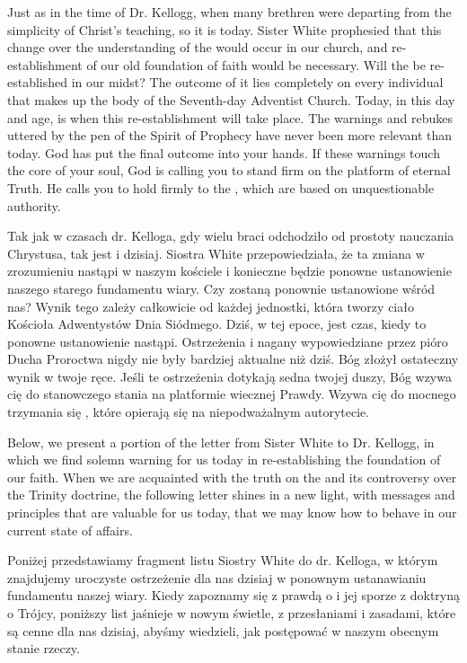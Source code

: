 Just as in the time of Dr. Kellogg, when many brethren were departing from the simplicity of Christ’s teaching, so it is today. Sister White prophesied that this change over the understanding of the  would occur in our church, and re-establishment of our old foundation of faith would be necessary. Will the  be re-established in our midst? The outcome of it lies completely on every individual that makes up the body of the Seventh-day Adventist Church. Today, in this day and age, is when this re-establishment will take place. The warnings and rebukes uttered by the pen of the Spirit of Prophecy have never been more relevant than today. God has put the final outcome into your hands. If these warnings touch the core of your soul, God is calling you to stand firm on the platform of eternal Truth. He calls you to hold firmly to the , which are based on unquestionable authority.


Tak jak w czasach dr. Kelloga, gdy wielu braci odchodziło od prostoty nauczania Chrystusa, tak jest i dzisiaj. Siostra White przepowiedziała, że ta zmiana w zrozumieniu  nastąpi w naszym kościele i konieczne będzie ponowne ustanowienie naszego starego fundamentu wiary. Czy  zostaną ponownie ustanowione wśród nas? Wynik tego zależy całkowicie od każdej jednostki, która tworzy ciało Kościoła Adwentystów Dnia Siódmego. Dziś, w tej epoce, jest czas, kiedy to ponowne ustanowienie nastąpi. Ostrzeżenia i nagany wypowiedziane przez pióro Ducha Proroctwa nigdy nie były bardziej aktualne niż dziś. Bóg złożył ostateczny wynik w twoje ręce. Jeśli te ostrzeżenia dotykają sedna twojej duszy, Bóg wzywa cię do stanowczego stania na platformie wiecznej Prawdy. Wzywa cię do mocnego trzymania się , które opierają się na niepodważalnym autorytecie.


Below, we present a portion of the letter from Sister White to Dr. Kellogg, in which we find solemn warning for us today in re-establishing the foundation of our faith. When we are acquainted with the truth on the  and its controversy over the Trinity doctrine, the following letter shines in a new light, with messages and principles that are valuable for us today, that we may know how to behave in our current state of affairs.


Poniżej przedstawiamy fragment listu Siostry White do dr. Kelloga, w którym znajdujemy uroczyste ostrzeżenie dla nas dzisiaj w ponownym ustanawianiu fundamentu naszej wiary. Kiedy zapoznamy się z prawdą o  i jej sporze z doktryną o Trójcy, poniższy list jaśnieje w nowym świetle, z przesłaniami i zasadami, które są cenne dla nas dzisiaj, abyśmy wiedzieli, jak postępować w naszym obecnym stanie rzeczy.


